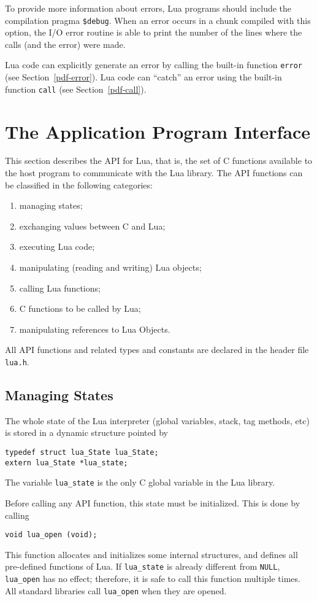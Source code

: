 \documentclass[11pt]{article}
\newcommand{\See}[1]{Section~\ref{#1}}
\newcommand{\see}[1]{(see \See{#1})}
\newcommand{\Deffunc}[1]{\index{#1}}
\begin{document}
To provide more information about errors,
Lua programs should include the compilation pragma \verb|$debug|.
\label{pragma}
When an error occurs in a chunk compiled with this option,
the I/O error routine is able to print the number of the
lines where the calls (and the error) were made.

Lua code can explicitly generate an error by calling the built-in
function \verb|error| \see{pdf-error}.
Lua code can ``catch'' an error using the built-in function
\verb|call| \see{pdf-call}.



\section{The Application Program Interface}

This section describes the API for Lua, that is,
the set of C functions available to the host program to communicate
with the Lua library.
The API functions can be classified in the following categories:
\begin{enumerate}
\item managing states;
\item exchanging values between C and Lua;
\item executing Lua code;
\item manipulating (reading and writing) Lua objects;
\item calling Lua functions;
\item C functions to be called by Lua;
\item manipulating references to Lua Objects.
\end{enumerate}
All API functions and related types and constants
are declared in the header file \verb|lua.h|.

\subsection{Managing States} \label{mangstate}
The whole state of the Lua interpreter
(global variables, stack, tag methods, etc)
is stored in a dynamic structure pointed by\Deffunc{lua_state}
\begin{verbatim}
typedef struct lua_State lua_State;
extern lua_State *lua_state;
\end{verbatim}
The variable \verb|lua_state| is the only C global variable in
the Lua library.

Before calling any API function,
this state must be initialized.
This is done by calling\Deffunc{lua_open}
\begin{verbatim}
void lua_open (void);
\end{verbatim}
This function allocates and initializes some internal structures,
and defines all pre-defined functions of Lua.
If \verb|lua_state| is already different from \verb|NULL|,
\verb|lua_open| has no effect;
therefore, it is safe to call this function multiple times.
All standard libraries call \verb|lua_open| when they are opened.
\end{document}
